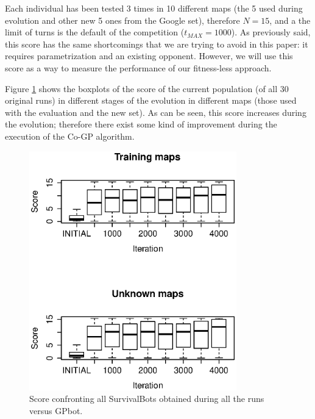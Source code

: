 \documentclass[conference]{IEEEtran}
\begin{document}
Each individual has been tested 3 times in 10 different maps (the 5 used during evolution and other new 5 ones from the Google set), therefore $N=15$, and a the limit of turns is the default of the competition ($t_{MAX}=1000$). As previously said, this score has the same shortcomings that we are trying to avoid in this paper: it requires parametrization and an existing opponent. However, we will use this score as a way to measure the performance of our fitness-less approach.

Figure \ref{figura:Score_VS_GPBot} shows the boxplots of the score of the current population (of all 30 original runs) in different stages of the evolution in different maps (those used  with the evaluation and the new set). As can be seen, this score increases during the evolution; therefore there exist some kind of improvement during the execution of the Co-GP algorithm.



\begin{figure}[htb]
\tiny
\begin{center}
\includegraphics[clip=true,width=9cm]{./imags/score_vs_gpbot.eps}
\end{center}
\caption{Score confronting all SurvivalBots obtained during all the runs versus GPbot.}
\label{figura:Score_VS_GPBot}
\end{figure}
\end{document}
